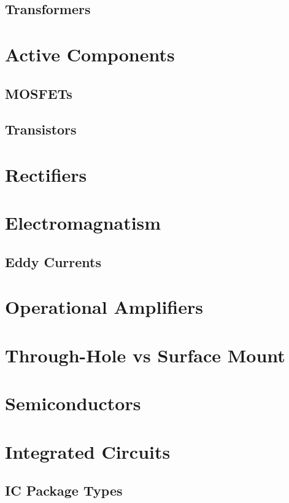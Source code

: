 \documentclass{article}
\begin{document}
\subsection{Transformers}

\section{Active Components}

\subsection{MOSFETs}

\subsection{Transistors}

\section{Rectifiers}

\section{Electromagnatism}

\subsection{Eddy Currents}

\section{Operational Amplifiers}

\section{Through-Hole vs Surface Mount}

\section{Semiconductors}

\section{Integrated Circuits}

\subsection{IC Package Types}
\end{document}

